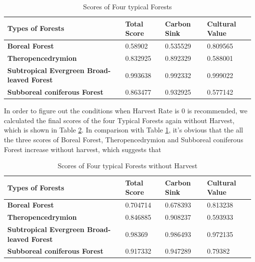 \documentclass{mcmthesis}
\numberwithin{figure}{section}
\numberwithin{table}{section}
\numberwithin{equation}{section}
\begin{document}
\begin{table}[htpb!]
  \centering
  \caption{Scores of Four typical Forests} \label{ForestScore}
  \begin{tabular}{m{5.5cm}<{\centering}|m{3cm}<{\centering}|m{3cm}<{\centering}|m{3cm}<{\centering}}
  \rowcolor{lightBlue}  \textbf{Types of Forests}&\textbf{Total Score}&\textbf{Carbon Sink}&\textbf{Cultural Value}\\ \hline
  \rowcolor{white} \textbf{Boreal Forest} & 0.58902 & 0.535529 & 0.809565 \\
  \rowcolor{lightBlue} \textbf{Theropencedrymion} &0.832925&0.892329&0.588001 \\
  \rowcolor{white} \textbf{Subtropical Evergreen Broad-leaved Forest} & 0.993638&0.992332 & 0.999022\\
  \rowcolor{lightBlue} \textbf{Subboreal coniferous Forest} & 0.863477 & 0.932925 &0.577142 \\
  \end{tabular}
\end{table}

In order to figure out the conditions when Harvest Rate is 0 is recommended, 
we calculated the final scores of the four Typical Forests again without Harvest, which 
is shown in Table \ref{ForestScore-NoHarvest}. In comparison with Table \ref{ForestScore}, 
it's obvious that the all the three scores of Boreal Forest, Theropencedrymion and 
Subboreal coniferous Forest increase without harvest, which suggests that 


\begin{table}[htpb!]
  \centering
  \caption{Scores of Four typical Forests without Harvest} \label{ForestScore-NoHarvest}
  \begin{tabular}{m{5.5cm}<{\centering}|m{3cm}<{\centering}|m{3cm}<{\centering}|m{3cm}<{\centering}}
  \rowcolor{lightBlue}  \textbf{Types of Forests}&\textbf{Total Score}&\textbf{Carbon Sink}&\textbf{Cultural Value}\\ \hline
  \rowcolor{white} \textbf{Boreal Forest} & 0.704714 & 0.678393 & 0.813238 \\
  \rowcolor{lightBlue} \textbf{Theropencedrymion} &0.846885&0.908237&0.593933 \\
  \rowcolor{white} \textbf{Subtropical Evergreen Broad-leaved Forest} & 0.98369&0.986493 & 0.972135\\
  \rowcolor{lightBlue} \textbf{Subboreal coniferous Forest} & 0.917332 & 0.947289 &0.79382 \\
  \end{tabular}
\end{table}
\end{document}
